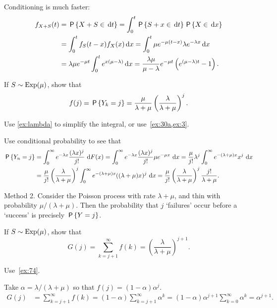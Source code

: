 \begin{exercise}
\begin{solution}
Conditioning is much faster:
 \begin{align*}
 f_{X+S}(t)
&= \P{X+S\in \d t}
= \int_0^t \P{S+x\in \d{t}}\P{X\in \d{x}} \\
&=\int_0^t f_S(t-x) f_X(x) \d{x}
 = \int_0^t \mu e^{-\mu(t-x)} \lambda e^{-\lambda x} \d{x} \\
 &= \lambda \mu e^{-\mu t} \int_0^t e^{x(\mu-\lambda)} \d{x} = \frac{\lambda \mu}{\mu - \lambda}e^{-\mu t}\left(e^{(\mu -\lambda)t} - 1\right).
 \end{align*}
\end{solution}
\end{exercise}


\begin{exercise}\label{ex:74}
 If $S\sim \Exp(\mu)$, show that
 \begin{equation*}
f(j) = \P{Y_k = j} = \frac{\mu}{\lambda+\mu}\left(\frac{\lambda}{\lambda+\mu}\right)^j.
 \end{equation*}
\begin{hint}
Use \cref{ex:lambda} to simplify the integral, or use~\cref{ex:30a,ex:3}.
\end{hint}
\begin{solution}
Use conditional probability to see that
\begin{align*}
 \P{Y_n = j}
&= \int_0^\infty e^{-\lambda x}\frac{(\lambda x)^j}{j!}\, \d F( x) = \int_0^\infty e^{-\lambda x}\frac{(\lambda x)^j}{j!} \mu e^{-\mu x}\, \d x
= \frac{\mu}{j!}\lambda^j \int_0^\infty e^{-(\lambda+\mu) x}x^j\,\d x \\
&= \frac{\mu}{j!}\left(\frac{\lambda}{\lambda+\mu}\right)^j \int_0^\infty e^{-(\lambda+\mu) x}((\lambda+\mu)x)^j\,\d x = \frac{\mu}{j!}\left(\frac{\lambda}{\lambda+\mu}\right)^j \frac{j!}{\lambda+\mu}.
\end{align*}

Method 2. Consider the Poisson process with rate $\lambda+\mu$, and thin with probability $\mu/(\lambda+\mu)$. Then the probability that $j$ `failures' occur before a `success' is precisely $\P{Y=j}$.
\end{solution}
\end{exercise}

\begin{exercise}\label{ex:l-225}
 If $S\sim \Exp(\mu)$, show that
 \begin{equation*}
G(j) = \sum_{k=j+1}^\infty f(k) = \left(\frac{\lambda}{\lambda+\mu}\right)^{j+1}.
 \end{equation*}
\begin{hint}
 Use~\cref{ex:74}.
\end{hint}
\begin{solution}
 Take $\alpha = \lambda/(\lambda+\mu)$ so that
 $f(j) = (1-\alpha) \alpha^j$.
\begin{align*}
 G(j)
&= \sum_{k=j+1}^\infty f(k) = (1-\alpha) \sum_{k=j+1}^\infty \alpha^k  = (1-\alpha) \alpha^{j+1}\sum_{k=0}^\infty \alpha^{k} = \alpha^{j+1}.
\end{align*}
\end{solution}
\end{exercise}


